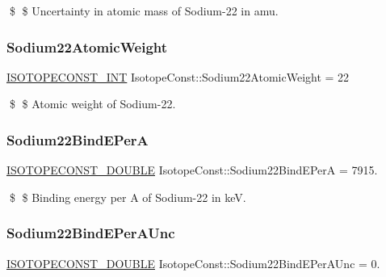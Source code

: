 \$ \$ Uncertainty in atomic mass of Sodium-\/22 in amu. \mbox{\label{group___isotope_const-_sodium-_na22_gadc061e8f0d3c6fb296264e4ad07f08c6}} 
\subsubsection{\texorpdfstring{Sodium22\+Atomic\+Weight}{Sodium22AtomicWeight}}
{\footnotesize\ttfamily \mbox{\hyperlink{group___isotope_const-_macros_ga5f18360b3e99483a35c32d789e62621c}{I\+S\+O\+T\+O\+P\+E\+C\+O\+N\+S\+T\+\_\+\+I\+NT}} Isotope\+Const\+::\+Sodium22\+Atomic\+Weight = 22}

\$ \$ Atomic weight of Sodium-\/22. \mbox{\label{group___isotope_const-_sodium-_na22_gafe006cf587d0be62e2ecd8d030cd3e4b}} 
\subsubsection{\texorpdfstring{Sodium22\+Bind\+E\+PerA}{Sodium22BindEPerA}}
{\footnotesize\ttfamily \mbox{\hyperlink{group___isotope_const-_macros_ga8f45a7272ce02c0b4c65c44636ed719a}{I\+S\+O\+T\+O\+P\+E\+C\+O\+N\+S\+T\+\_\+\+D\+O\+U\+B\+LE}} Isotope\+Const\+::\+Sodium22\+Bind\+E\+PerA = 7915.}

\$ \$ Binding energy per A of Sodium-\/22 in keV. \mbox{\label{group___isotope_const-_sodium-_na22_gabba1ccc5ad1c52beb5494edb1c90187a}} 
\subsubsection{\texorpdfstring{Sodium22\+Bind\+E\+Per\+A\+Unc}{Sodium22BindEPerAUnc}}
{\footnotesize\ttfamily \mbox{\hyperlink{group___isotope_const-_macros_ga8f45a7272ce02c0b4c65c44636ed719a}{I\+S\+O\+T\+O\+P\+E\+C\+O\+N\+S\+T\+\_\+\+D\+O\+U\+B\+LE}} Isotope\+Const\+::\+Sodium22\+Bind\+E\+Per\+A\+Unc = 0.}

